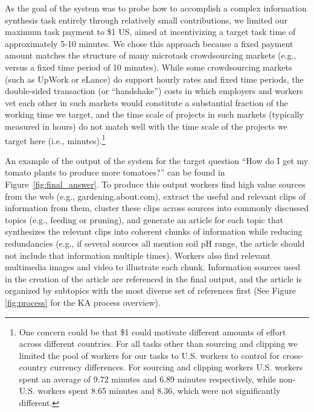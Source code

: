 As the goal of the system was to probe how to accomplish a complex information synthesis task entirely through relatively small contributions, we limited our maximum task payment to \$1 US, aimed at incentivizing a target task time of approximately 5-10 minutes. We chose this approach because a fixed payment amount matches the structure of many microtask crowdsourcing markets (e.g., versus a fixed time period of 10 minutes). While some crowdsourcing markets (such as UpWork or eLance) do support hourly rates and fixed time periods, the double-sided transaction (or ``handshake'') costs in which employers and workers vet each other in such markets would constitute a substantial fraction of the working time we target, and the time scale of projects in such markets (typically measured in hours) do not match well with the time scale of the projects we target here (i.e., minutes).\footnote{One concern could be that \$1 could motivate different amounts of effort across different countries. For all tasks other than sourcing and clipping we limited the pool of workers for our tasks to U.S. workers to control for cross-country currency differences. For sourcing and clipping workers U.S. workers spent an average of 9.72 minutes and 6.89 minutes respectively, while non-U.S. workers spent 8.65 minutes and 8.36, which were not significantly different.} 

An example of the output of the system for the target question ``How do I get my tomato plants to produce more tomatoes?'' can be found in Figure~\ref{fig:final_answer}. To produce this output workers find high value sources from the web (e.g., gardening.about.com), extract the useful and relevant clips of information from them, cluster these clips across sources into commonly discussed topics (e.g., feeding or pruning), and generate an article for each topic that synthesizes the relevant clips into coherent chunks of information while reducing redundancies (e.g., if several sources all mention soil pH range, the article should not include that information multiple times). Workers also find relevant multimedia images and video to illustrate each chunk. Information sources used in the creation of the article are referenced in the final output, and the article is organized by subtopics with the most diverse set of references first (See Figure \ref{fig:process} for the KA process overview). 

